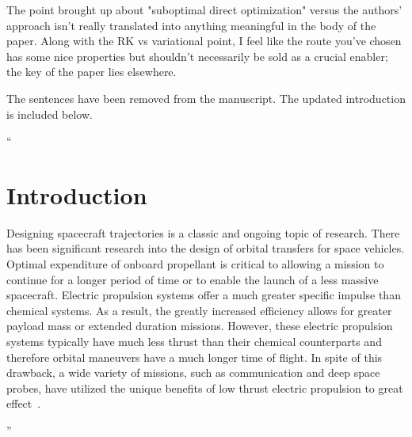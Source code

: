 \documentclass[11pt]{article}
\newenvironment{correction}{\begin{list}{}{\setlength{\leftmargin}{1cm}\setlength{\rightmargin}{1cm}}\vspace{\parsep}\item[]``}{''\end{list}}
\begin{document}
\begin{itemize}
    \item 
        \begin{itshape}
            The point brought up about "suboptimal direct optimization" versus the authors' approach isn't really translated into anything meaningful in the body of the paper. Along with the RK vs variational point, I feel like the route you've chosen has some nice properties but shouldn't necessarily be sold as a crucial enabler; the key of the paper lies elsewhere.
        \end{itshape}

        The sentences have been removed from the manuscript.
        The updated introduction is included below.

        \begin{correction}
            \section{Introduction}



            Designing spacecraft trajectories is a classic and ongoing topic of research.
            There has been significant research into the design of orbital transfers for space vehicles.
            Optimal expenditure of onboard propellant is critical to allowing a mission to continue for a longer period of time or to enable the launch of a less massive spacecraft.
            Electric propulsion systems offer a much greater specific impulse than chemical systems.
            As a result, the greatly increased efficiency allows for greater payload mass or extended duration missions.
            However, these electric propulsion systems typically have much less thrust than their chemical counterparts and therefore orbital maneuvers have a much longer time of flight.
            In spite of this drawback, a wide variety of missions, such as communication and deep space probes, have utilized the unique benefits of low thrust electric propulsion to great effect~\cite{choueiri2009}.


\end{correction}
\end{itemize}
\end{document}
